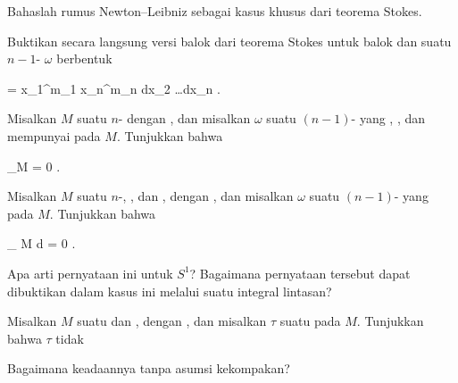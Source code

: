 \setcounter{section}{23}


{}
{

Bahaslah
rumus Newton--Leibniz
sebagai kasus khusus dari
teorema Stokes.

}
{} {}

{}
{

Buktikan secara langsung
versi balok dari teorema Stokes
untuk balok
\mathl{[a_1,b_1] \times \cdots \times [a_n,b_n]}{} dan suatu
$n-1$-
$\omega$ berbentuk

\mavergleichskettedisp
{\vergleichskette
{ \omega
}
{ =} { x_1^{m_1 } \cdots x_n^{m_n }  dx_2 \wedge \ldots \wedge dx_n
}
{ } {
}
{ } {
}
{ } {
}
}
{}{}{.}

}
{} {}

{}
{

Misalkan $M$ suatu
$n$-
dengan
,
dan misalkan $\omega$ suatu $(n-1)$-
yang
,
, dan mempunyai
pada $M$. Tunjukkan bahwa

\mavergleichskettedisp
{\vergleichskette
{ \int_{\partial M} \omega
}
{ =} { 0
}
{ } {
}
{ } {
}
{ } {
}
}
{}{}{.}

}
{} {}

{}
{

Misalkan $M$ suatu
$n$-,
, dan
 {} {},
dengan
,
dan misalkan $\omega$ suatu
$(n-1)$-
yang
pada $M$. Tunjukkan bahwa

\mavergleichskettedisp
{\vergleichskette
{
\int_{ M  }  d\omega
}
{ =} { 0
}
{ } {
}
{ } {
}
{ } {
}
}
{}{}{.}

}
{Apa arti pernyataan ini untuk $S^1$? Bagaimana pernyataan tersebut dapat dibuktikan dalam kasus ini melalui suatu integral lintasan?} {}

{}
{

Misalkan $M$ suatu
 dan
 {} {},
dengan
,
dan misalkan $\tau$ suatu
pada $M$. Tunjukkan bahwa $\tau$ tidak

}
{Bagaimana keadaannya tanpa asumsi kekompakan?} {}

